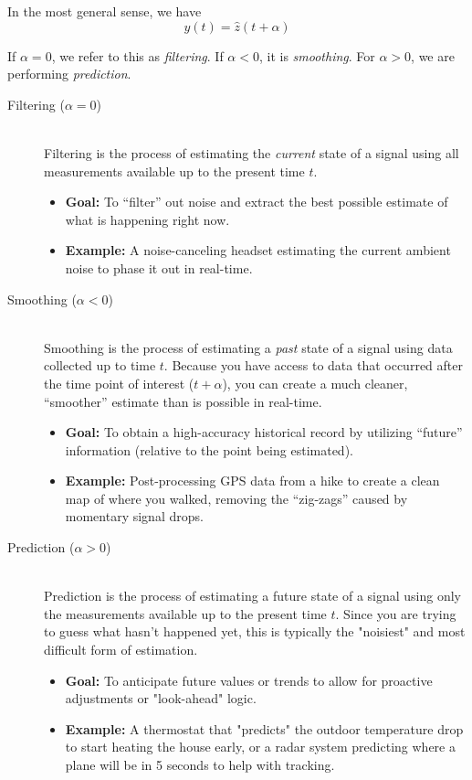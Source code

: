 \documentclass[12pt]{book}
\theoremstyle{definition}
\begin{document}
In the most general sense, we have 
\[
y(t) = \hat{z}(t + \alpha)
\]

If $\alpha = 0$, we refer to this as \emph{filtering}. If $\alpha < 0$, it is  \emph{smoothing}. For $\alpha > 0$, we are performing  \emph{prediction}.\\

\begin{description}
    \item[Filtering ($\alpha = 0$)] \hfill \\
    Filtering is the process of estimating the \textit{current} state of a signal using all measurements available up to the present time $t$.
    \begin{itemize}
        \item \textbf{Goal:} To ``filter'' out noise and extract the best possible estimate of what is happening right now.
        \item \textbf{Example:} A noise-canceling headset estimating the current ambient noise to phase it out in real-time.
    \end{itemize}

    \item[Smoothing ($\alpha < 0$)] \hfill \\
    Smoothing is the process of estimating a \textit{past} state of a signal using data collected up to time $t$. Because you have access to data that occurred after the time point of interest ($t + \alpha$), you can create a much cleaner, ``smoother'' estimate than is possible in real-time.
    \begin{itemize}
        \item \textbf{Goal:} To obtain a high-accuracy historical record by utilizing ``future'' information (relative to the point being estimated).
        \item \textbf{Example:} Post-processing GPS data from a hike to create a clean map of where you walked, removing the ``zig-zags'' caused by momentary signal drops.
    \end{itemize}

    \item [Prediction ($\alpha > 0$)] \hfill \\
    Prediction is the process of estimating a future state of a signal using only the measurements available up to the present time $t$. Since you are trying to guess what hasn't happened yet, this is typically the "noisiest" and most difficult form of estimation.
    \begin{itemize}
    \item \textbf{Goal:} To anticipate future values or trends to allow for proactive adjustments or "look-ahead" logic.
    \item \textbf{Example:} A thermostat that "predicts" the outdoor temperature drop to start heating the house early, or a radar system predicting where a plane will be in 5 seconds to help with tracking.
    \end{itemize}
\end{description}
\end{document}
